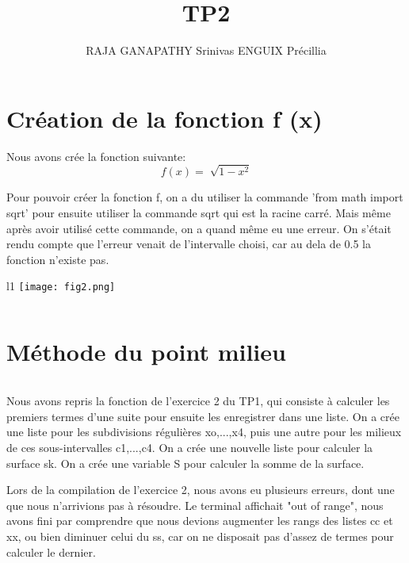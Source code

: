 \documentclass{article}
\title{TP2}
\author{RAJA GANAPATHY Srinivas ENGUIX Précillia}
\begin{document}
\maketitle
        
\section{Création de la fonction f (x)}
$$ $$
        Nous avons crée la fonction suivante:
$$f(x) = \sqrt[]{1 - x^2} $$

Pour pouvoir créer la fonction f, on a du utiliser la commande 'from math import sqrt' pour ensuite utiliser la commande sqrt qui est la racine carré.
Mais même après avoir utilisé cette commande, on a quand même eu une erreur.
On s'était rendu compte que l'erreur venait de l'intervalle choisi, car au dela de 0.5 la fonction n'existe pas.

\begin{wrapfigure}{l}{1\textwidth}
        \centering
        \texttt{[image: fig2.png]}
       
\end{wrapfigure}

$$ $$
$$ $$
$$ $$
$$ $$
$$ $$
$$ $$
$$ $$
$$ $$
$$ $$
$$ $$
$$ $$
$$ $$



\section{Méthode du point milieu}

$$ $$

Nous avons repris la fonction de l'exercice 2 du TP1, qui consiste à calculer les premiers termes d'une suite pour ensuite les enregistrer dans une liste. On a crée une liste pour les subdivisions régulières xo,...,x4, puis une autre pour les milieux de ces sous-intervalles c1,...,c4. On a crée une nouvelle liste pour calculer la surface sk. On a crée une variable S pour calculer la somme de la surface.
\newline
\newline

Lors de la compilation de l'exercice 2, nous avons eu plusieurs erreurs, dont une que nous n'arrivions pas à résoudre. Le terminal affichait "out of range", nous avons fini par comprendre que nous devions augmenter les rangs des listes cc et xx, ou bien diminuer celui du ss, car on ne disposait pas d'assez de termes pour calculer le dernier.
\newline
\newline
\end{document}
